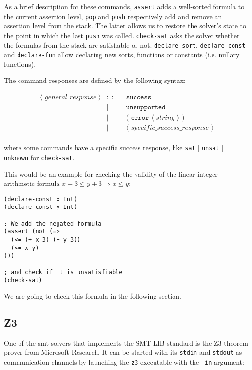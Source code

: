 As a brief description for these commands, \verb|assert| adds a well-sorted
formula to the current assertion level, \verb|pop| and \verb|push| respectively
add and remove an assertion level from the stack. The latter allows us to
restore the solver's state to the point in which the last \verb|push| was
called.  \verb|check-sat| asks the solver whether the formulas from the stack
are satisfiable or not.  \verb|declare-sort|, \verb|declare-const| and
\verb|declare-fun| allow declaring new sorts, functions or constants (i.e.
nullary functions).

The command responses are defined by the following syntax:

\[
\begin{array}{rcll}
\langle\textit{ general\_response }\rangle & ::= & \texttt{success}\\
& | & \texttt{unsupported}\\
& | & \texttt{( error } \langle\textit{ string }\rangle \texttt{ ) }\\
& | & \langle\textit{ specific\_success\_response }\rangle\\
\end{array}
\]

where some commands have a specific success response, like \verb|sat| |
\verb|unsat| | \verb|unknown| for \verb|check-sat|.

This would be an example for checking the validity of the linear integer 
arithmetic formula $x + 3 \leq y + 3 \Rightarrow x \leq y$:

\begin{verbatim}
(declare-const x Int)
(declare-const y Int)

; We add the negated formula
(assert (not (=> 
  (<= (+ x 3) (+ y 3)) 
  (<= x y)
)))

; and check if it is unsatisfiable
(check-sat)
\end{verbatim}

We are going to check this formula in the following section.

\subsection{Z3}

One of the \acrshort{smt} solvers that implements the SMT-LIB standard is the Z3
theorem prover from Microsoft Research. It can be started with its \verb|stdin|
and \verb|stdout| as communication channels by launching the \verb|z3|
executable with the \verb|-in| argument:

